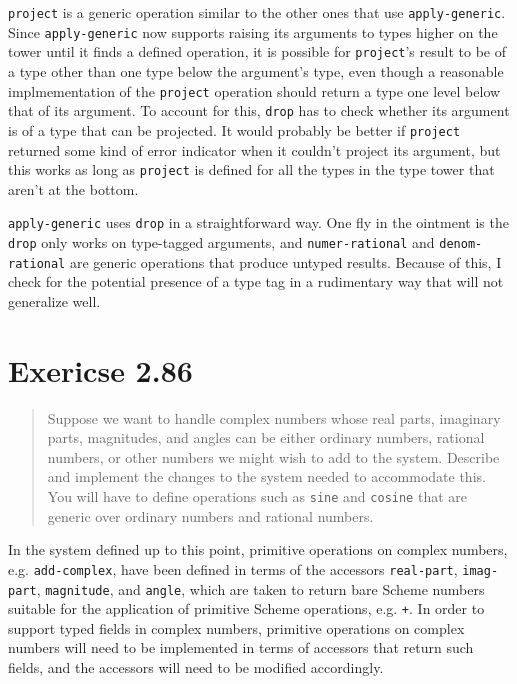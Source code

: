 \documentclass{article}
\begin{document}
\texttt{project} is a generic operation similar to the other ones that use
\texttt{apply-generic}. Since \texttt{apply-generic} now supports raising its
arguments to types higher on the tower until it finds a defined operation, it is
possible for \texttt{project}'s result to be of a type other than one type below
the argument's type, even though a reasonable implmementation of the
\texttt{project} operation should return a type one level below that of its
argument. To account for this, \texttt{drop} has to check whether its argument
is of a type that can be projected. It would probably be better if
\texttt{project} returned some kind of error indicator when it couldn't project
its argument, but this works as long as \texttt{project} is defined for all the
types in the type tower that aren't at the bottom.





\texttt{apply-generic} uses \texttt{drop} in a straightforward way. One fly in
the ointment is the \texttt{drop} only works on type-tagged arguments, and
\texttt{numer-rational} and \texttt{denom-rational} are generic operations that
produce untyped results. Because of this, I check for the potential presence of
a type tag in a rudimentary way that will not generalize well.



\section{Exericse 2.86}
\begin{quote}
    Suppose we want to handle complex numbers whose real parts, imaginary
    parts, magnitudes, and angles can be either ordinary numbers, rational
    numbers, or other numbers we might wish to add to the system. Describe and
    implement the changes to the system needed to accommodate this. You will
    have to define operations such as \texttt{sine} and \texttt{cosine} that
    are generic over ordinary numbers and rational numbers.
\end{quote}

In the system defined up to this point, primitive operations on complex numbers,
e.g. \texttt{add-complex}, have been defined in terms of the accessors
\texttt{real-part}, \texttt{imag-part}, \texttt{magnitude}, and \texttt{angle},
which are taken to return bare Scheme numbers suitable for the application of
primitive Scheme operations, e.g. \texttt{+}. In order to support typed fields
in complex numbers, primitive operations on complex numbers will need to be
implemented in terms of accessors that return such fields, and the accessors
will need to be modified accordingly.
\end{document}
